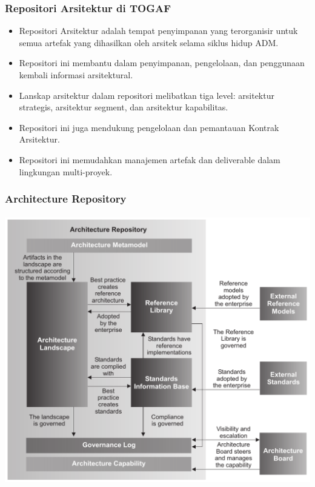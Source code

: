 \documentclass[aspectratio=169, table]{beamer}
\begin{document}
	\begin{frame}
		\frametitle{Repositori Arsitektur di TOGAF}
		\begin{itemize}
			\item Repositori Arsitektur adalah tempat penyimpanan yang terorganisir untuk semua artefak yang dihasilkan oleh arsitek selama siklus hidup ADM.
			\item Repositori ini membantu dalam penyimpanan, pengelolaan, dan penggunaan kembali informasi arsitektural.
			\item Lanskap arsitektur dalam repositori melibatkan tiga level: arsitektur strategis, arsitektur segment, dan arsitektur kapabilitas.
			\item Repositori ini juga mendukung pengelolaan dan pemantauan Kontrak Arsitektur.
			\item Repositori ini memudahkan manajemen artefak dan deliverable dalam lingkungan multi-proyek.
		\end{itemize}
	\end{frame}


	{
		\begin{frame}
			\frametitle{Architecture Repository}
			\framesubtitle{\hspace{1cm}}
			\begin{center}
				\includegraphics[width=.65\textwidth]{../figures/architecture_repository}
			\end{center}
		\end{frame}
	}
\end{document}

